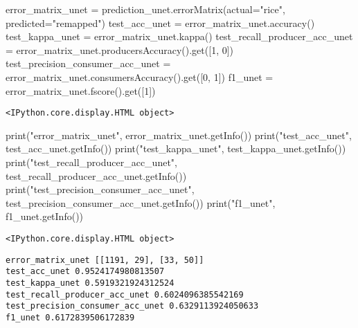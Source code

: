 \documentclass[
  letterpaper,
  DIV=11,
  numbers=noendperiod]{scrreprt}
\newenvironment{Shaded}{\begin{snugshade}}{\end{snugshade}}
\newcommand{\BuiltInTok}[1]{\textcolor[rgb]{0.00,0.23,0.31}{#1}}
\newcommand{\DecValTok}[1]{\textcolor[rgb]{0.68,0.00,0.00}{#1}}
\newcommand{\NormalTok}[1]{\textcolor[rgb]{0.00,0.23,0.31}{#1}}
\newcommand{\OperatorTok}[1]{\textcolor[rgb]{0.37,0.37,0.37}{#1}}
\newcommand{\StringTok}[1]{\textcolor[rgb]{0.13,0.47,0.30}{#1}}
\begin{document}
\begin{Shaded}
\begin{Highlighting}[]
\NormalTok{error\_matrix\_unet }\OperatorTok{=}\NormalTok{ prediction\_unet.errorMatrix(actual}\OperatorTok{=}\StringTok{"rice"}\NormalTok{, predicted}\OperatorTok{=}\StringTok{"remapped"}\NormalTok{)}
\NormalTok{test\_acc\_unet }\OperatorTok{=}\NormalTok{ error\_matrix\_unet.accuracy()}
\NormalTok{test\_kappa\_unet }\OperatorTok{=}\NormalTok{ error\_matrix\_unet.kappa()}
\NormalTok{test\_recall\_producer\_acc\_unet }\OperatorTok{=}\NormalTok{ error\_matrix\_unet.producersAccuracy().get([}\DecValTok{1}\NormalTok{, }\DecValTok{0}\NormalTok{])}
\NormalTok{test\_precision\_consumer\_acc\_unet }\OperatorTok{=}\NormalTok{ error\_matrix\_unet.consumersAccuracy().get([}\DecValTok{0}\NormalTok{, }\DecValTok{1}\NormalTok{])}
\NormalTok{f1\_unet }\OperatorTok{=}\NormalTok{ error\_matrix\_unet.fscore().get([}\DecValTok{1}\NormalTok{])}
\end{Highlighting}
\end{Shaded}

\begin{verbatim}
<IPython.core.display.HTML object>
\end{verbatim}

\begin{Shaded}
\begin{Highlighting}[]
\BuiltInTok{print}\NormalTok{(}\StringTok{"error\_matrix\_unet"}\NormalTok{, error\_matrix\_unet.getInfo())}
\BuiltInTok{print}\NormalTok{(}\StringTok{"test\_acc\_unet"}\NormalTok{, test\_acc\_unet.getInfo())}
\BuiltInTok{print}\NormalTok{(}\StringTok{"test\_kappa\_unet"}\NormalTok{, test\_kappa\_unet.getInfo())}
\BuiltInTok{print}\NormalTok{(}\StringTok{"test\_recall\_producer\_acc\_unet"}\NormalTok{, test\_recall\_producer\_acc\_unet.getInfo())}
\BuiltInTok{print}\NormalTok{(}\StringTok{"test\_precision\_consumer\_acc\_unet"}\NormalTok{, test\_precision\_consumer\_acc\_unet.getInfo())}
\BuiltInTok{print}\NormalTok{(}\StringTok{"f1\_unet"}\NormalTok{, f1\_unet.getInfo())}
\end{Highlighting}
\end{Shaded}

\begin{verbatim}
<IPython.core.display.HTML object>
\end{verbatim}

\begin{verbatim}
error_matrix_unet [[1191, 29], [33, 50]]
test_acc_unet 0.9524174980813507
test_kappa_unet 0.5919321924312524
test_recall_producer_acc_unet 0.6024096385542169
test_precision_consumer_acc_unet 0.6329113924050633
f1_unet 0.6172839506172839
\end{verbatim}
\end{document}
